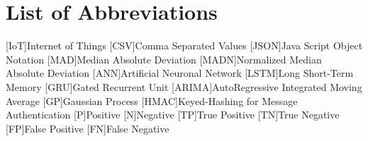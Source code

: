 \newpage





\newpage
\listoffigures


\newpage
\listoftables
\clearpage

\renewcommand\listoflistingscaption{List of source codes}
\listoflistings
\clearpage


{}
\chapter*{List of Abbreviations}
\begin{acronym}%
	[IoT]{Internet of Things}
	[CSV]{Comma Separated Values }
	[JSON]{Java Script Object Notation}
	[MAD]{Median Absolute Deviation}
	[MADN]{Normalized Median Absolute Deviation}
	[ANN]{Artificial Neuronal Network}
	[LSTM]{Long Short-Term Memory}
	[GRU]{Gated Recurrent Unit}
	[ARIMA]{AutoRegressive Integrated Moving Average}
	[GP]{Gaussian Process}
	[HMAC]{Keyed-Hashing for Message Authentication}
	{Positive}
	{Negative}
	[TP]{True Positive}
	[TN]{True Negative}
	[FP]{False Positive}
	[FN]{False Negative}
\end{acronym}
